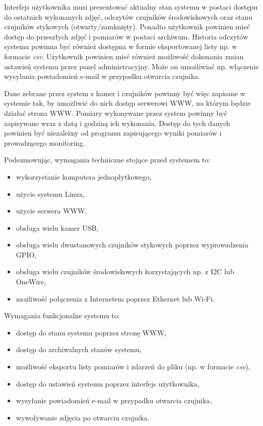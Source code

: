 \documentclass[a4paper,12pt,twoside]{article}
\begin{document}
Interfejs użytkownika musi prezentować aktualny stan systemu w postaci dostępu do ostatnich wykonanych zdjęć, odczytów czujników środowiskowych oraz stanu czujników stykowych (otwarty/zamknięty). Ponadto użytkownik powinien mieć dostęp do przeszłych zdjęć i pomiarów w postaci archiwum. Historia odczytów systemu powinna być również dostępna w formie eksportowanej listy np. w formacie \textit{csv}. Użytkownik powinien mieć również możliwość dokonania zmian ustawień systemu przez panel administracyjny. Może on umożliwiać np. włączenie wysyłania powiadomień e-mail w przypadku otwarcia czujnika.

Dane zebrane przez system z kamer i czujników powinny być więc zapisane w systemie tak, by umożliwić do nich dostęp serwerowi WWW, na którym będzie działać strona WWW. Pomiary wykonywane przez system powinny być zapisywane wraz z datą i godziną ich wykonania. Dostęp do tych danych powinien być niezależny od programu zapisującego wyniki pomiarów i prowadzącego monitoring.

Podsumowując, wymagania techniczne stojące przed systemem to:
\begin{itemize}
\item wykorzystanie komputera jednopłytkowego,
\item użycie systemu Linux,
\item użycie serwera WWW,
\item obsługa wielu kamer USB,
\item obsługa wielu dwustanowych czujników stykowych poprzez wyprowadzenia GPIO,
\item obsługa wielu czujników środowiskowych korzystających np. z I2C lub OneWire,
\item możliwość połączenia z Internetem poprzez Ethernet lub Wi-Fi.
\end{itemize}

Wymagania funkcjonalne systemu to:
\begin{itemize}
\item dostęp do stanu systemu poprzez stronę WWW,
\item dostęp do archiwalnych stanów systemu,
\item możliwość eksportu listy pomiarów i zdarzeń do pliku (np. w formacie \textit{csv}),
\item dostęp do ustawień systemu poprzez interfejs użytkownika,
\item wysyłanie powiadomień e-mail w przypadku otwarcia czujnika,
\item wywoływanie zdjęcia po otwarciu czujnika.
\end{itemize}
\end{document}
